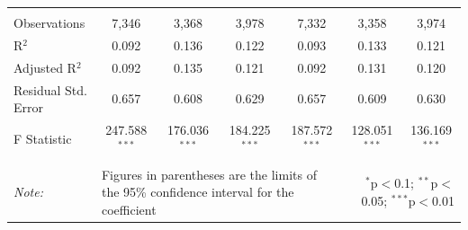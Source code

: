 \documentclass[alpha-refs]{wiley-article-01g}
\begin{document}
\begin{landscape}
\begin{table}[!htbp]
\begin{tabular}{@{\extracolsep{5pt}}lcccccc}
  & & & & & & \\ 
\hline \\[-3ex] 
Observations & 7,346 & 3,368 & 3,978 & 7,332 & 3,358 & 3,974 \\ 
R$^{2}$ & 0.092 & 0.136 & 0.122 & 0.093 & 0.133 & 0.121 \\ 
Adjusted R$^{2}$ & 0.092 & 0.135 & 0.121 & 0.092 & 0.131 & 0.120 \\ 
Residual Std. Error & 0.657 & 0.608 & 0.629 & 0.657 & 0.609 & 0.630 \\ 
F Statistic & 247.588$^{***}$ & 176.036$^{***}$ & 184.225$^{***}$ & 187.572$^{***}$ & 128.051$^{***}$ & 136.169$^{***}$ \\ 
\hline 
\hline \\[-3ex] 
\textit{Note:} &\multicolumn{4}{l}{Figures in parentheses are the limits of the 95\% confidence interval for the coefficient}  & \multicolumn{2}{r}{$^{*}$p$<$0.1; $^{**}$p$<$0.05; $^{***}$p$<$0.01} \\ 
\end{tabular} 
\end{table} 

\end{landscape}

\newpage
\end{document}
